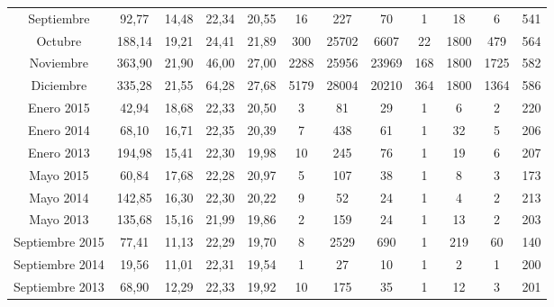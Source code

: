 \begin{landscape}
\begin{table}[ht!]
{\begin{tabular}{|c|c|c|c|c|c|c|c|c|c|c|c|}
        Septiembre      & 92,77     & 14,48     & 22,34  & 20,55 & 16    & 227   & 70    & 1    & 18    & 6      & 541 \\
        Octubre         & 188,14    & 19,21     & 24,41  & 21,89 & 300   & 25702 & 6607  & 22   & 1800  & 479    & 564 \\
        Noviembre       & 363,90    & 21,90     & 46,00  & 27,00 & 2288  & 25956 & 23969 & 168  & 1800  & 1725   & 582 \\
        Diciembre       & 335,28    & 21,55     & 64,28  & 27,68 & 5179  & 28004 & 20210 & 364  & 1800  & 1364   & 586 \\
        \hline 
        Enero 2015      & 42,94     & 18,68     & 22,33  & 20,50 & 3     & 81    & 29    & 1    & 6     &  2     & 220 \\
        Enero 2014      & 68,10     & 16,71     & 22,35  & 20,39 & 7     & 438   & 61    & 1    & 32    &  5     & 206 \\
        Enero 2013      & 194,98    & 15,41     & 22,30  & 19,98 & 10    & 245   & 76    & 1    & 19    &  6     & 207 \\
        Mayo 2015       & 60,84     & 17,68     & 22,28  & 20,97 & 5     & 107   & 38    & 1    & 8     &  3     & 173 \\
        Mayo 2014       & 142,85    & 16,30     & 22,30  & 20,22 & 9     & 52    & 24    & 1    & 4     &  2     & 213 \\
        Mayo 2013       & 135,68    & 15,16     & 21,99  & 19,86 & 2     & 159   & 24    & 1    & 13    &  2     & 203 \\
        Septiembre 2015 & 77,41     & 11,13     & 22,29  & 19,70 & 8     & 2529  & 690   & 1    & 219   &  60    & 140 \\
        Septiembre 2014 & 19,56     & 11,01     & 22,31  & 19,54 & 1     & 27    & 10    & 1    & 2     &  1     & 200 \\
        Septiembre 2013 & 68,90     & 12,29     & 22,33  & 19,92 & 10    & 175   & 35    & 1    & 12    &  3     & 201 \\
        \hline  
    \end{tabular}
    }   
\end{table}
\end{landscape}

